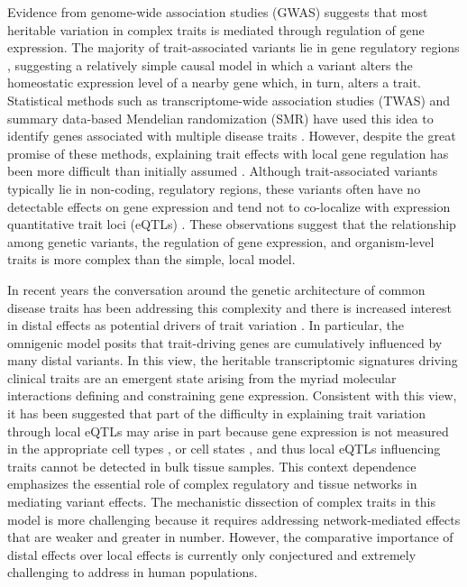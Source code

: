 \documentclass[
]{article}
\begin{document}
Evidence from genome-wide association studies (GWAS) suggests that most
heritable variation in complex traits is mediated through regulation of
gene expression. The majority of trait-associated variants lie in gene
regulatory regions
\cite{pmid22955828, pmid25363779, pmid21617055, pmid19474294, 
pmid24702953, pmid24316577, pmid27126046}, suggesting a relatively
simple causal model in which a variant alters the homeostatic expression
level of a nearby gene which, in turn, alters a trait. Statistical
methods such as transcriptome-wide association studies (TWAS)
\cite{pmid33020666, pmid26258848, pmid27019110, pmid26854917} and
summary data-based Mendelian randomization (SMR) \cite{pmid27019110}
have used this idea to identify genes associated with multiple disease
traits \cite{pmid29567659, 
pmid35533209,  pmid27309819, pmid30950127}. However, despite the great
promise of these methods, explaining trait effects with local gene
regulation has been more difficult than initially assumed
\cite{pmid32912663, pmid36515579}. Although trait-associated variants
typically lie in non-coding, regulatory regions, these variants often
have no detectable effects on gene expression \cite{pmid32912663} and
tend not to co-localize with expression quantitative trait loci (eQTLs)
\cite{pmid36515579, pmid37857933}. These observations suggest that the
relationship among genetic variants, the regulation of gene expression,
and organism-level traits is more complex than the simple, local model.

In recent years the conversation around the genetic architecture of
common disease traits has been addressing this complexity and there is
increased interest in distal effects as potential drivers of trait
variation \cite{pmid37857933, pmid32424349, 
pmid32831138, pmid30950127}. In particular, the omnigenic model posits
that trait-driving genes are cumulatively influenced by many distal
variants. In this view, the heritable transcriptomic signatures driving
clinical traits are an emergent state arising from the myriad molecular
interactions defining and constraining gene expression. Consistent with
this view, it has been suggested that part of the difficulty in
explaining trait variation through local eQTLs may arise in part because
gene expression is not measured in the appropriate cell types
\cite{pmid32912663}, or cell states \cite{pmid35545678}, and thus local
eQTLs influencing traits cannot be detected in bulk tissue samples. This
context dependence emphasizes the essential role of complex regulatory
and tissue networks in mediating variant effects. The mechanistic
dissection of complex traits in this model is more challenging because
it requires addressing network-mediated effects that are weaker and
greater in number. However, the comparative importance of distal effects
over local effects is currently only conjectured and extremely
challenging to address in human populations.
\end{document}
